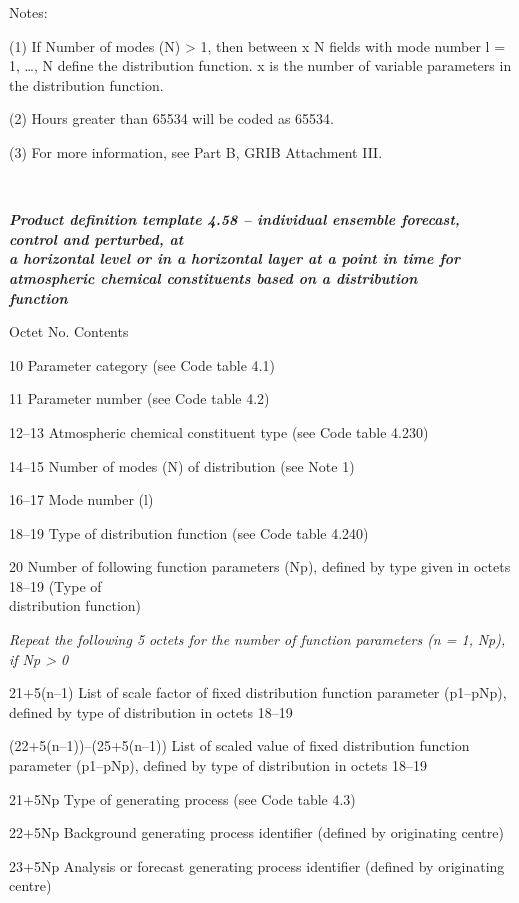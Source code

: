 Notes:

(1) If Number of modes (N) \textgreater{} 1, then between x N fields with mode number l = 1, \ldots, N define the distribution function. x is the number of variable parameters in the distribution function.

(2) Hours greater than 65534 will be coded as 65534.

(3) For more information, see Part B, GRIB Attachment III.

\emph{\textbf{\\
}}

\emph{\textbf{Product definition template 4.58 -- individual ensemble forecast, control and perturbed, at\\
a horizontal level or in a horizontal layer at a point in time for\\
atmospheric chemical constituents based on a distribution\\
function}}

Octet No. Contents

10 Parameter category (see Code table 4.1)

11 Parameter number (see Code table 4.2)

12--13 Atmospheric chemical constituent type (see Code table 4.230)

14--15 Number of modes (N) of distribution (see Note 1)

16--17 Mode number (l)

18--19 Type of distribution function (see Code table 4.240)

20 Number of following function parameters (Np), defined by type given in octets 18--19 (Type of\\
distribution function)

\emph{Repeat the following 5 octets for the number of function parameters (n = 1,} \emph{Np), if Np \textgreater{} 0}

21+5(n--1) List of scale factor of fixed distribution function parameter (p1--pNp), defined by type of distribution in octets 18--19

(22+5(n--1))--(25+5(n--1)) List of scaled value of fixed distribution function parameter (p1--pNp), defined by type of distribution in octets 18--19

21+5Np Type of generating process (see Code table 4.3)

22+5Np Background generating process identifier (defined by originating centre)

23+5Np Analysis or forecast generating process identifier (defined by originating centre)

